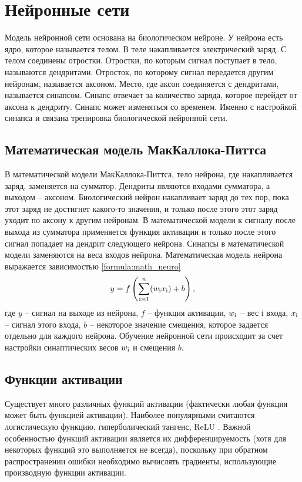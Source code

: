 \section{Нейронные сети}\label{sec:neuro_net}
Модель нейронной сети основана на биологическом нейроне.
У нейрона есть ядро, которое называется телом. 
В теле накапливается электрический заряд.
С телом соединены отростки.
Отростки, по которым сигнал поступает в тело, называются дендритами. 
Отросток, по которому сигнал передается другим нейронам, называется аксоном. 
Место, где аксон соединяется с дендритами, называется синапсом. 
Синапс отвечает за количество заряда, которое перейдет от аксона к дендриту. 
Синапс может изменяться со временем. 
Именно с настройкой синапса и связана тренировка биологической нейронной сети.

\subsection{Математическая модель МакКаллока-Питтса}
В математической модели МакКаллока-Питтса, тело нейрона, где накапливается заряд, заменяется на сумматор. 
Дендриты являются входами сумматора, а выходом -- аксоном. 
Биологический нейрон накапливает заряд до тех пор, пока этот заряд не достигнет какого-то значения, и только после этого этот заряд уходит по аксону к другим нейронам. 
В математической модели к сигналу после выхода из сумматора применяется функция активации и только после этого сигнал попадает на дендрит следующего нейрона. 
Синапсы в математической модели заменяются на веса входов нейрона. 
Математическая модель нейрона выражается зависимостью \ref{formula:math_neuro}
\begin{equation}\label{formula:math_neuro}
y = f\left(\sum\limits_{i = 1}^{n}(w_{\rm{i}}x_{\rm{i}}) + b\right),
\end{equation}
где $y$ -- сигнал на выходе из нейрона, $f$ -- функция активации, $w_{\rm{i}}$ -- вес i входа, $x_{\rm{i}}$ -- сигнал этого входа, $b$ -- некоторое значение смещения, которое задается отдельно для каждого нейрона.
Обучение нейронной сети происходит за счет настройки синаптических весов $w_{\rm{i}}$ и смещения $b$.

\subsection{Функции активации}
Существует много различных функций активации (фактически любая функция может быть функцией активации).
Наиболее популярными считаются логистическую функцию, гиперболический тангенс, ReLU \cite{activation_function}. Важной особенностью функций активации является их дифференцируемость (хотя для некоторых функций это выполняется не всегда), поскольку при обратном распространении ошибки необходимо вычислять градиенты, использующие производную функции активации.

